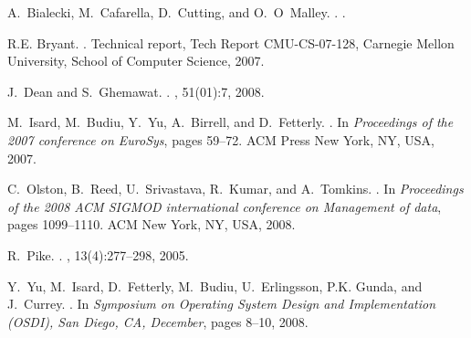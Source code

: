 \documentclass{sig-alt-release2}
\begin{document}
\begin{thebibliography}{1}

A.~Bialecki, M.~Cafarella, D.~Cutting, and O.~O~Malley.
.
.

R.E. Bryant.
.
\newblock Technical report, Tech Report CMU-CS-07-128, Carnegie Mellon
  University, School of Computer Science, 2007.

J.~Dean and S.~Ghemawat.
.
, 51(01):7, 2008.

M.~Isard, M.~Budiu, Y.~Yu, A.~Birrell, and D.~Fetterly.
.
\newblock In {\em Proceedings of the 2007 conference on EuroSys}, pages 59--72.
  ACM Press New York, NY, USA, 2007.

C.~Olston, B.~Reed, U.~Srivastava, R.~Kumar, and A.~Tomkins.
.
\newblock In {\em Proceedings of the 2008 ACM SIGMOD international conference
  on Management of data}, pages 1099--1110. ACM New York, NY, USA, 2008.

R.~Pike.
.
, 13(4):277--298, 2005.

Y.~Yu, M.~Isard, D.~Fetterly, M.~Budiu, U.~Erlingsson, P.K. Gunda, and
  J.~Currey.
.
\newblock In {\em Symposium on Operating System Design and Implementation
  (OSDI), San Diego, CA, December}, pages 8--10, 2008.

\end{thebibliography}
\end{document}
